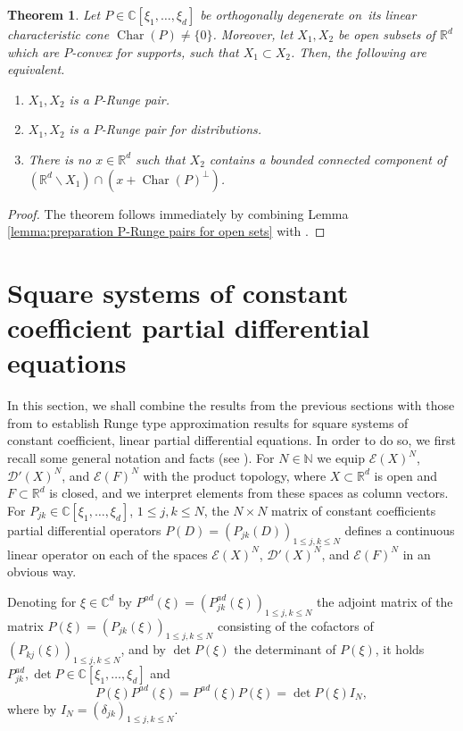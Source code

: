 \documentclass[a4paper,10pt]{amsart}
\newtheorem{theorem}{Theorem}
\newtheorem*{crucial lemma}{Lemma \ref{lem:nice polynomial2}}
\theoremstyle{definition}
\newcommand{\R}{\mathbb{R}}
\newcommand{\C}{\mathbb{C}}
\newcommand{\N}{\mathbb{N}}
\newcommand{\Pad}{P^{ad}}
\newcommand{\detP}{\operatorname{det}\!P}
\newcommand{\charcone}{\operatorname{Char}}
\newcommand{\veryniceon}[1]{orthogonally degenerate on~#1}
\begin{document}
\begin{theorem}\label{th:P-Runge pairs for open sets}
	Let $P\in\C[\xi_1,\ldots,\xi_d]$ be \veryniceon{its linear characteristic cone $\charcone(P)\neq \{0\}$}. Moreover, let $X_1, X_2$ be open subsets of $\R^d$ which are $P$-convex for supports, such that $X_1\subset X_2$. Then, the following are equivalent.
	\begin{enumerate}
		\item[\upshape{(i)}] $X_1, X_2$ is a $P$-Runge pair.
		\item[\upshape{(ii)}] $X_1, X_2$ is a $P$-Runge pair for distributions.
		\item[\upshape{(iii)}] There is no $x\in\R^d$ such that $X_2$ contains a bounded connected component of $\left(\R^d\backslash X_1\right)\cap\left(x+\charcone(P)^\perp\right)$.
	\end{enumerate}
\end{theorem}

\begin{proof}
	The theorem follows immediately by combining Lemma \ref{lemma:preparation P-Runge pairs for open sets} with \cite[Theorem 6]{Kalmes2021}.
\end{proof}

\section{Square systems of constant coefficient partial differential equations}\label{sec:systems}

In this section, we shall combine the results from the previous sections with those from \cite{Kalmes2021,CiasKalmes2025} to establish Runge type approximation results for square systems of constant coefficient, linear partial differential equations. In order to do so, we first recall some general notation and facts (see \cite[Section 3.8]{Hormander1976}). For $N\in\N$ we equip $\mathscr{E}(X)^N$, $\mathscr{D}'(X)^N$, and $\mathscr{E}(F)^N$ with the product topology, where $X\subset\R^d$ is open and $F\subset\R^d$ is closed, and we interpret elements from these spaces as column vectors. For $P_{jk}\in \C[\xi_1,\ldots,\xi_d]$, $1\leq j,k\leq N$, the $N\times N$ matrix of constant coefficients partial differential operators $P(D)=(P_{jk}(D))_{1\leq j,k\leq N}$ defines a continuous linear operator on each of the spaces $\mathscr{E}(X)^N$, $\mathscr{D}'(X)^N$, and $\mathscr{E}(F)^N$ in an obvious way.

Denoting for $\xi\in \C^d$ by $\Pad(\xi)=(\Pad_{jk}(\xi))_{1\leq j,k\leq N}$ the adjoint matrix of the matrix $P(\xi)=(P_{jk}(\xi))_{1\leq j,k\leq N}$ consisting of the cofactors of $(P_{kj}(\xi))_{1\leq j,k\leq N}$, and by $\detP(\xi)$ the determinant of $P(\xi)$, it holds $\Pad_{jk}, \detP\in\C[\xi_1,\ldots,\xi_d]$ and
\begin{equation}\label{eq:fundamental for systems 1}
	P(\xi)\Pad(\xi)=\Pad(\xi)P(\xi)=\detP(\xi)I_N,
\end{equation}
where by $I_N=(\delta_{jk})_{1\leq j,k\leq N}$.
\end{document}
